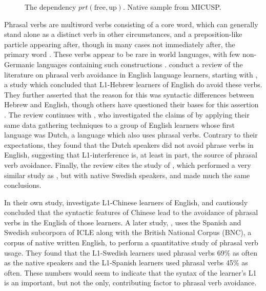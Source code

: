 \documentclass[main.tex]{subfiles}
\begin{document}
\begin{figure}[h]
\caption{The dependency $prt(\text{free},\text{up})$. Native sample from MICUSP.}
\centering
{}
\label{ex:prt-en1}
\end{figure}

Phrasal verbs are multiword verbs consisting of a core word, which can generally stand alone as a distinct verb in other circumstances, and a preposition-like particle appearing after, though in many cases not immediately after, the primary word \citep{celce-murcia:1999}. These verbs appear to be rare in world languages, with few non-Germanic languages containing such constructions \citep{celce-murcia:1999}. \citet{liao:2004} conduct a review of the literature on phrasal verb avoidance in English language learners, starting with \citep{dagut:1985}, a study which concluded that L1-Hebrew learners of English do avoid these verbs. They further asserted that the reason for this was syntactic differences between Hebrew and English, though others have questioned their bases for this assertion \citep{liao:2004}. The review continues with \citep{hulstijn:1989}, who investigated the claims of \citeauthor{dagut:1985} by applying their same data gathering techniques to a group of English learners whose first language was Dutch, a language which also uses phrasal verbs. Contrary to their expectations, they found that the Dutch speakers did not avoid phrase verbs in English, suggesting that L1-interference is, at least in part, the source of phrasal verb avoidance. Finally, the review cites the study of \citet{laufer:1993}, which performed a very similar study as \citeauthor{hulstijn:1989}, but with native Swedish speakers, and made much the same conclusions.

In their own study, \citeauthor{liao:2004} investigate L1-Chinese learners of English, and cautiously concluded that the syntactic features of Chinese lead to the avoidance of phrasal verbs in the English of those learners. A later study, \citet{gonzalez:2010}, uses the Spanish and Swedish subcorpora of ICLE along with the British National Corpus (BNC), a corpus of native written English, to perform a quantitative study of phrasal verb usage. They found that the L1-Swedish learners used phrasal verbs 69\% as often as the native speakers and the L1-Spanish learners used phrasal verbs 45\% as often. These numbers would seem to indicate that the syntax of the learner's L1 is an important, but not the only, contributing factor to phrasal verb avoidance.
\end{document}
